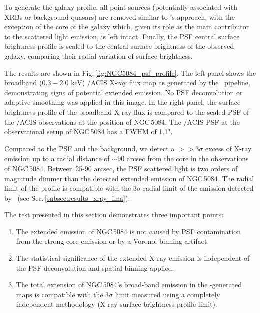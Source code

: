 \documentclass[modern]{aastex631}
\begin{document}
To generate the galaxy profile, all point sources (potentially associated with XRBs or background quasars) are removed similar to \SAUNAS's approach, with the exception of the core of the galaxy which, given its role as the main contributor to the scattered light emission, is left intact. Finally, the PSF central surface brightness profile is scaled to the central surface brightness of the observed galaxy, comparing their radial variation of surface brightness.

The results are shown in Fig.\,\ref{fig:NGC5084_psf_profile}. The left panel shows the broadband ($0.3-2.0$ keV) \Chandra/ACIS X-ray flux map as generated by the \ciao\ pipeline, demonstrating signs of potential extended emission. No PSF deconvolution or adaptive smoothing was applied in this image. In the right panel, the surface brightness profile of the broadband X-ray flux is compared to the scaled PSF of the \Chandra/ACIS observations at the position of NGC\,5084. The \Chandra/ACIS PSF at the observational setup of NGC\,5084 has a FWHM of 1.1".

Compared to the PSF and the background, we detect a $>>3\sigma$ excess of X-ray emission up to a radial distance of $\sim90$ arcsec from the core in the observations of NGC\,5084. Between 25-90 arcsec, the PSF scattered light is two orders of magnitude dimmer than the detected extended emission of NGC\,5084. The radial limit of the profile is compatible with the $3\sigma$ radial limit of the emission detected by \SAUNAS\ (see Sec.\,\ref{subsec:results_xray_ima}).

The test presented in this section demonstrates three important points:

\begin{enumerate}
    \item The extended emission of NGC\,5084 is not caused by PSF contamination from the strong core emission or by a Voronoi binning artifact.
    
    \item The statistical significance of the extended X-ray emission is independent of the PSF deconvolution and spatial binning applied.

    \item The total extension of NGC\,5084's broad-band emission in the \SAUNAS-generated maps is compatible with the $3\sigma$ limit measured using a completely independent methodology (X-ray surface brightness profile limit).
\end{enumerate}
\end{document}
